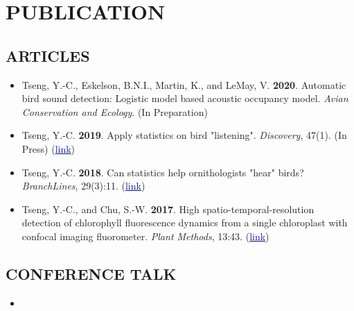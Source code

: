 \documentclass[11pt,letterpaper,sans]{moderncv}        %
\begin{document}
{%
\section{PUBLICATION}
\subsection{ARTICLES}
\begin{itemize}
\item{Tseng, Y.-C., Eskelson, B.N.I., Martin, K., and LeMay, V. \textbf{2020}. Automatic bird sound detection: Logistic model based acoustic occupancy model. \textit{Avian Conservation and Ecology}. (In Preparation)}
\vspace{3pt}

\item{Tseng, Y.-C. \textbf{2019}. Apply statistics on bird "listening". \textit{Discovery}}, 47(1). (In Press) (\href{https://naturevancouver.ca/publications/discovery/}{\textcolor{blue}{link}})
\vspace{3pt}

\item{Tseng, Y.-C. \textbf{2018}. Can statistics help ornithologists "hear" birds? \textit{BranchLines}}, 29(3):11. (\href{https://forestry.ubc.ca/files/2019/04/bl-29.3.pdf}{\textcolor{blue}{link}}) 
\vspace{3pt}

\item{Tseng, Y.-C., and Chu, S.-W. \textbf{2017}. High spatio-temporal-resolution detection of chlorophyll fluorescence dynamics from a single chloroplast with confocal imaging fluorometer. \textit{Plant Methods}, 13:43. (\href{https://doi.org/10.1186/s13007-017-0194-2}{\textcolor{blue}{link}})}
\end{itemize}


\subsection{CONFERENCE TALK}

\begin{itemize}
\item{}




\end{itemize}}
\end{document}
